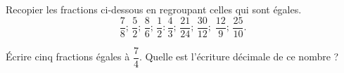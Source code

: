 
\begin{exercice}\label{exosmath-0798}

Recopier les fractions ci-dessous en regroupant celles qui sont égales.
\begin{equation}
    \dfrac{ 7 }{ 8 };\,\dfrac{ 5 }{ 2 };\,\dfrac{ 8 }{ 6 };\,\dfrac{ 1 }{ 2 }:\dfrac{ 4 }{ 3 };\,\dfrac{ 21 }{ 24 };\,\dfrac{ 30 }{ 12 };\;\dfrac{ 12 }{ 9 };\,\dfrac{ 25 }{ 10 }.
\end{equation}

Écrire cinq fractions égales à \( \dfrac{ 7 }{ 4 }\). Quelle est l'écriture décimale de ce nombre ?

\end{exercice}
